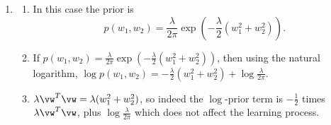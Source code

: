 \documentclass{article}
\begin{document}
\begin{enumerate}
\item \label{ML_ex_MAP_solution}
\begin{enumerate}
    \item In this case the prior is 
$$p(w_1, w_2) = \frac{\lambda}{2\pi}\exp\left(-\frac\lambda2(w_1^2+w_2^2)\right).$$
    \item If $p(w_1, w_2) = \frac{\lambda}{2\pi}\exp\left(-\frac\lambda2(w_1^2+w_2^2)\right)$, then using the natural logarithm, $\log p(w_1,w_2) = - \frac{\lambda}{2}(w_1^2+w_2^2) + \log \frac{\lambda}{2\pi}$. 
    \item $\lambda \vw^T \vw = \lambda(w_1^2 + w_2^2)$, so indeed the $\log$-prior term is $-\frac12$ times $\lambda \vw^T \vw$, plus $\log\frac\lambda{2\pi}$ which does not affect the learning process.
\end{enumerate}


\end{enumerate}
\end{document}
